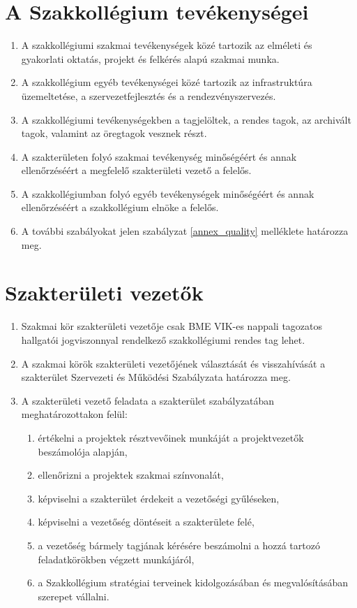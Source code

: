 \documentclass[12pt]{report}
\begin{document}

\section{A Szakkollégium tevékenységei}

\begin{enumerate}
  \item A szakkollégiumi szakmai tevékenységek közé tartozik az elméleti és gyakorlati oktatás, projekt és felkérés alapú szakmai munka.
  \item A szakkollégium egyéb tevékenységei közé tartozik az infrastruktúra üzemeltetése, a szervezetfejlesztés és a rendezvényszervezés.
  \item A szakkollégiumi tevékenységekben a tagjelöltek, a rendes tagok, az archivált tagok, valamint az öregtagok vesznek részt.
  \item A szakterületen folyó szakmai tevékenység minőségéért és annak ellenőrzéséért a megfelelő szakterületi vezető a felelős.
  \item A szakkollégiumban folyó egyéb tevékenységek minőségéért és annak ellenőrzéséért a szakkollégium elnöke a felelős.
  \item A további szabályokat jelen szabályzat \ref{annex_quality} melléklete határozza meg.
\end{enumerate}


\section{Szakterületi vezetők} \label{sec_leaders}

\begin{enumerate}
  \item Szakmai kör szakterületi vezetője csak BME VIK-es nappali tagozatos hallgatói jogviszonnyal rendelkező szakkollégiumi rendes tag lehet.
  \item A szakmai körök szakterületi vezetőjének választását és visszahívását a szakterület Szervezeti és Működési Szabályzata határozza meg.
  \item A szakterületi vezető feladata a szakterület szabályzatában meghatározottakon felül:
  \begin{enumerate}
    \item értékelni a projektek résztvevőinek munkáját a projektvezetők beszámolója alapján,
    \item ellenőrizni a projektek szakmai színvonalát,
    \item képviselni a szakterület érdekeit a vezetőségi gyűléseken,
    \item képviselni a vezetőség döntéseit a szakterülete felé,
    \item a vezetőség bármely tagjának kérésére beszámolni a hozzá tartozó feladatkörökben végzett munkájáról,
    \item a Szakkollégium stratégiai terveinek kidolgozásában és megvalósításában szerepet vállalni.
  \end{enumerate}
\end{enumerate}
\end{document}
